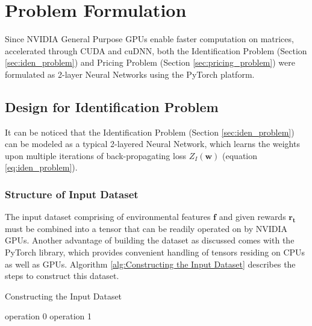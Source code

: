 \documentclass[12pt]{article}
\newcommand{\vect}[1]{\mathbf{#1}}
\newcommand{\matr}[1]{\mathbf{#1}}
\begin{document}
    \section{Problem Formulation}
    Since NVIDIA General Purpose GPUs enable faster computation on matrices, accelerated through CUDA and cuDNN, both the Identification Problem (Section \ref{sec:iden_problem}) and Pricing Problem (Section \ref{sec:pricing_problem}) were formulated as 2-layer Neural Networks using the PyTorch platform.
    
    \subsection{Design for Identification Problem}
    It can be noticed that the Identification Problem (Section \ref{sec:iden_problem}) can be modeled as a typical 2-layered Neural Network, which learns the weights upon multiple iterations of back-propagating loss $Z_I(\matr{w})$ (equation \ref{eq:iden_problem}).
    
    \subsubsection{Structure of Input Dataset}
    The input dataset comprising of environmental features $\vect{f}$ and given rewards $\vect{r_t}$ must be combined into a tensor that can be readily operated on by NVIDIA GPUs. Another advantage of building the dataset as discussed comes with the PyTorch library, which provides convenient handling of tensors residing on CPUs as well as GPUs. Algorithm \ref{alg:Constructing the Input Dataset} describes the steps to construct this dataset.
    \begin{algorithm}
        \caption{Constructing the Input Dataset} \label{alg:Constructing the Input Dataset}
        \begin{algorithmic}[1]
            \State operation 0
            \State operation 1
        \end{algorithmic}
    \end{algorithm}
    
\end{document}
